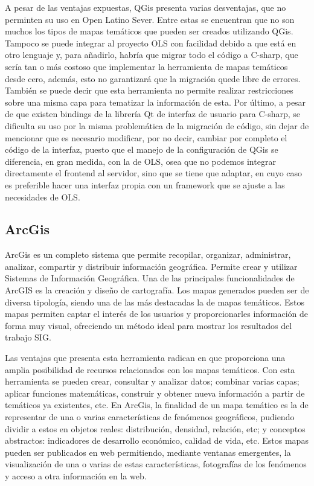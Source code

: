 A pesar de las ventajas expuestas, QGis presenta varias desventajas, que no perminten su uso en Open Latino Sever. Entre estas se encuentran que no son muchos los tipos de mapas tem\'aticos que pueden ser creados utilizando QGis. Tampoco se puede integrar al proyecto OLS con facilidad debido a que est\'a en otro lenguaje y, para a\~nadirlo, habr\'ia que migrar todo el c\'odigo a C-sharp, que ser\'ia tan o m\'as costoso que implementar la herramienta de mapas tem\'aticos desde cero, adem\'as, esto no garantizar\'a que la migraci\'on quede libre de errores. Tambi\'en se puede decir que esta herramienta no permite realizar restricciones sobre una misma capa para tematizar la informaci\'on de esta. Por \'ultimo, a pesar de que existen bindings de la librer\'ia Qt de interfaz de usuario para C-sharp, se dificulta su uso por la misma problem\'atica de la migraci\'on de c\'odigo, sin dejar de mencionar que es necesario modificar, por no decir, cambiar por completo el c\'odigo de la interfaz, puesto que el manejo de la configuraci\'on de QGis se diferencia, en gran medida, con la de OLS, osea que no podemos integrar directamente el frontend al servidor, sino que se tiene que adaptar, en cuyo caso es preferible hacer una interfaz propia con un framework que se ajuste a las necesidades de OLS.


\subsection{ArcGis}
ArcGis es un completo sistema que permite recopilar, organizar, administrar, analizar, compartir y distribuir informaci\'on geogr\'afica. Permite crear y utilizar Sistemas de Informaci\'on Geogr\'afica. Una de las principales funcionalidades de ArcGIS es la creaci\'on y dise\~no de cartograf\'ia. Los mapas generados pueden ser de diversa tipolog\'ia, siendo una de las m\'as destacadas la de mapas tem\'aticos. Estos mapas permiten captar el inter\'es de los usuarios y proporcionarles informaci\'on de forma muy visual, ofreciendo un m\'etodo ideal para mostrar los resultados del trabajo SIG.

Las ventajas que presenta esta herramienta radican en que proporciona una amplia posibilidad de recursos relacionados con los mapas tem\'aticos. Con esta herramienta se pueden crear, consultar y analizar datos; combinar varias capas; aplicar funciones matem\'aticas, construir y obtener nueva informaci\'on a partir de tem\'aticos ya existentes, etc. En ArcGis, la finalidad de un mapa tem\'atico es la de representar de una o varias caracter\'isticas de fen\'omenos geogr\'aficos, pudiendo dividir a estos en objetos reales: distribuci\'on, densidad, relaci\'on, etc; y conceptos abstractos: indicadores de desarrollo econ\'omico, calidad de vida, etc. Estos mapas pueden ser publicados en web permitiendo, mediante ventanas emergentes, la visualizaci\'on de una o varias de estas caracter\'isticas,  fotograf\'ias de los fen\'omenos y acceso a otra informaci\'on en la web. \cite{ART}

